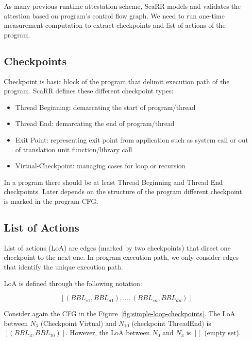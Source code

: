 As many previous runtime attestation scheme, ScaRR models and validates the
attestion based on program's control flow graph. We need to run one-time
measurement computation to extract checkpoints and list of actions of the
program.

\subsection{Checkpoints} \label{sec:scarr-checkpoints} Checkpoint is basic block
of the program that delimit execution path of the program. ScaRR defines these
different checkpoint types:
\begin{itemize}
    \item Thread Beginning: demarcating the start of program/thread
    \item Thread End: demarcating the end of program/thread
    \item Exit Point: representing exit point from application such as system
    call or out of translation unit function/library call
    \item Virtual-Checkpoint: managing cases for loop or recursion
\end{itemize}

In a program there should be at least Thread Beginning and Thread End
checkpoints. Later depends on the structure of the program different checkpoint
is marked in the program CFG.

\subsection{List of Actions}

List of actions (LoA) are edges (marked by two checkpoints) that direct one
checkpoint to the next one. In program execution path, we only consider edges
that identify the unique execution path.

LoA is defined through the following notation:


$$[(BBL_{s1},BBL_{d1}),...,(BBL_{sn},BBL_{dn})]$$

Consider again the CFG in the Figure~\ref{fig:simple-loop-checkpoints}. The LoA
between $N_3$ (Checkpoint Virtual) and $N_{10}$ (checkpoint ThreadEnd) is
$[(BBL_3, BBL_{10})]$. However, the LoA between $N_0$ and $N_3$ is $[]$ (empty
set).

